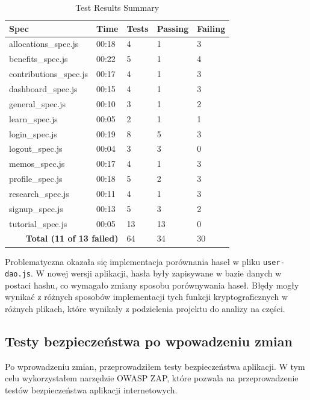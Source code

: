 \begin{table}[H]
  \centering
  \caption{Test Results Summary}
  \label{table:test_results_summary}
  \begin{tabular}{|l|l|l|l|l|}
  \hline
  \textbf{Spec} & \textbf{Time} & \textbf{Tests} & \textbf{Passing} & \textbf{Failing} \\ \hline
  allocations\_spec.js & 00:18 & 4 & 1 & 3 \\ \hline
  benefits\_spec.js & 00:22 & 5 & 1 & 4 \\ \hline
  contributions\_spec.js & 00:17 & 4 & 1 & 3 \\ \hline
  dashboard\_spec.js & 00:15 & 4 & 1 & 3 \\ \hline
  general\_spec.js & 00:10 & 3 & 1 & 2 \\ \hline
  learn\_spec.js & 00:05 & 2 & 1 & 1 \\ \hline
  login\_spec.js & 00:19 & 8 & 5 & 3 \\ \hline
  logout\_spec.js & 00:04 & 3 & 3 & 0 \\ \hline
  memos\_spec.js & 00:17 & 4 & 1 & 3 \\ \hline
  profile\_spec.js & 00:18 & 5 & 2 & 3 \\ \hline
  research\_spec.js & 00:11 & 4 & 1 & 3 \\ \hline
  signup\_spec.js & 00:13 & 5 & 3 & 2 \\ \hline
  tutorial\_spec.js & 00:05 & 13 & 13 & 0 \\ \hline
  \multicolumn{2}{|r|}{\textbf{Total (11 of 13 failed)}} & 64 & 34 & 30 \\ \hline
  \end{tabular}
  \end{table}

Problematyczna okazała się implementacja porównania haseł w pliku \texttt{user-dao.js}. W nowej wersji aplikacji, hasła były zapisywane w bazie danych w postaci hashu, co wymagało zmiany sposobu porównywania haseł. Błędy mogły wynikać z różnych sposobów implementacji tych funkcji kryptograficznych w różnych plikach, które wynikały z podzielenia projektu do analizy na części.

\subsection{Testy bezpieczeństwa po wpowadzeniu zmian}
Po wprowadzeniu zmian, przeprowadziłem testy bezpieczeństwa aplikacji. W tym celu wykorzystałem narzędzie OWASP ZAP, które pozwala na przeprowadzenie testów bezpieczeństwa aplikacji internetowych. 
